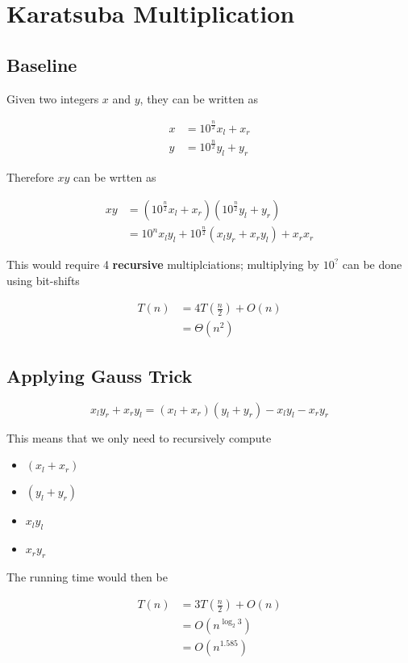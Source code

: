 \section{Karatsuba Multiplication}

\subsection{Baseline}

  Given two integers $ x $ and $ y $, they can be written as

  \begin{align*}
    x &= 10^{\frac{n}{2}} x_{l} + x_{r} \\
    y &= 10^{\frac{n}{2}} y_{l} + y_{r}
  \end{align*}

  Therefore $ xy $ can be wrtten as

  \begin{align*}
    xy &=
      \left( 10^{\frac{n}{2}} x_{l} + x_{r} \right)
      \left( 10^{\frac{n}{2}} y_{l} + y_{r} \right) \\
    &=
      10^{n} x_{l} y_{l}
      + 10^{\frac{n}{2}} \left( x_{l} y_{r} + x_{r} y_{l} \right)
      + x_{r} x_{r}
  \end{align*}

  This would require 4 \textbf{recursive} multiplciations;
  multiplying by $ 10^{?} $ can be done using bit-shifts

  \begin{align*}
    T\left( n \right) &= 4 T\left( \frac{n}{2} \right) + O\left( n \right) \\
    &= \Theta\left( n^{2} \right)
  \end{align*}

\subsection{Applying Gauss Trick}

  \begin{equation*}
    x_{l} y_{r} + x_{r} y_{l} =
    \left( x_{l} + x_{r} \right)
    \left( y_{l} + y_{r} \right)
    - x_{l} y_{l} - x_{r} y_{r}
  \end{equation*}

  This means that we only need to recursively compute

  \begin{itemize}
    \item $ \left( x_{l} + x_{r} \right) $
    \item $ \left( y_{l} + y_{r} \right) $
    \item $ x_{l} y_{l} $
    \item $ x_{r} y_{r} $
  \end{itemize}

  The running time would then be

  \begin{align*}
    T\left( n \right)
    &= 3 T\left( \frac{n}{2} \right) + O\left( n \right) \\
    &= O\left( n^{\log_{2} 3} \right) \\
    &= O\left( n^{1.585} \right)
  \end{align*}
